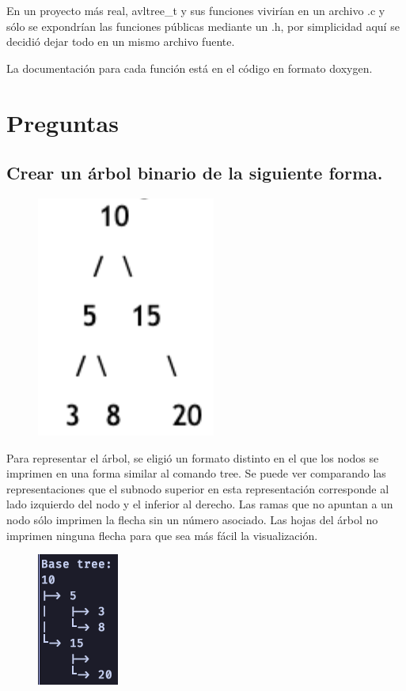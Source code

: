 \documentclass[a4paper,notitlepage]{article}
\begin{document}
En un proyecto más real, avltree{\_}t y sus funciones vivirían en un archivo .c
y sólo se expondrían las funciones públicas mediante un .h, por simplicidad
aquí se decidió dejar todo en un mismo archivo fuente.

La documentación para cada función está en el código en formato doxygen.

\pagebreak

\section{Preguntas}
\subsection{Crear un árbol binario de la siguiente forma.}
\begin{figure}[H]
    \centering
    \includegraphics[scale=0.65]{imgs/base-tree.png}
\end{figure}

Para representar el árbol, se eligió un formato distinto en el que los nodos
se imprimen en una forma similar al comando tree. Se puede ver comparando las
representaciones que el subnodo superior en esta representación corresponde
al lado izquierdo del nodo y el inferior al derecho. Las ramas que no apuntan
a un nodo sólo imprimen la flecha sin un número asociado. Las hojas del árbol
no imprimen ninguna flecha para que sea más fácil la visualización.

\begin{figure}[H]
    \centering
    \includegraphics[scale=0.65]{imgs/base-tree-run.png}
\end{figure}
\end{document}
